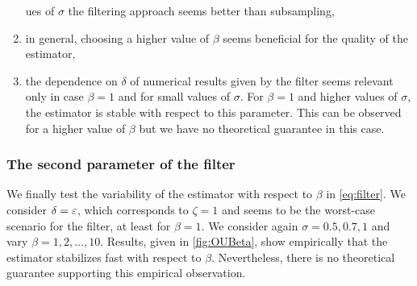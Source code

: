 \documentclass[review,onefignum,onetabnum]{siamonline190516}
\begin{document}
\begin{enumerate}
ues of $\sigma$ the filtering approach seems better than subsampling, 
	\item in general, choosing a higher value of $\beta$ seems beneficial for the quality of the estimator,
	\item the dependence on $\delta$ of numerical results given by the filter seems relevant only in case $\beta = 1$ and for small values of $\sigma$. For $\beta = 1$ and higher values of $\sigma$, the estimator is stable with respect to this parameter. This can be observed for a higher value of $\beta$ but we have no theoretical guarantee in this case.
\end{enumerate}

\subsubsection{The second parameter of the filter}\label{sec:Num_Param3}
We finally test the variability of the estimator with respect to $\beta$ in \eqref{eq:filter}. We consider $\delta = \varepsilon$, which corresponds to $\zeta = 1$ and seems to be the worst-case scenario for the filter, at least for $\beta = 1$. We consider again $\sigma = 0.5, 0.7, 1$ and vary $\beta = 1, 2, \ldots, 10$. Results, given in \cref{fig:OUBeta}, show empirically that the estimator stabilizes fast with respect to $\beta$. Nevertheless, there is no theoretical guarantee supporting this empirical observation.
\end{document}
